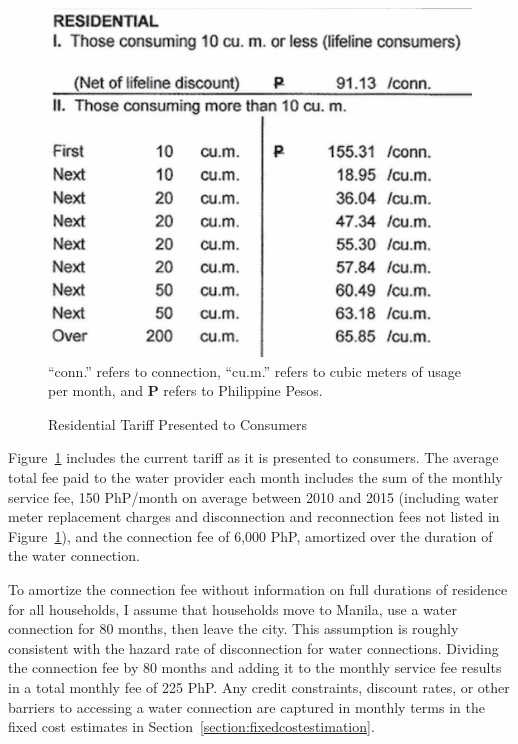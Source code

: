 \documentclass[12pt]{article}
\begin{document}
\begin{appendices}
\begin{figure}
\caption{Residential Tariff Presented to Consumers}\label{figure:tarifftrue}
\begin{center}
\includegraphics[scale=.8]{tables/tariff_pic_png.png} \\
\footnotesize{``conn.'' refers to connection, ``cu.m.'' refers to cubic meters of usage \\ per month, and \textbf{P} refers to Philippine Pesos.}
\end{center}
\end{figure}

Figure~\ref{figure:tarifftrue} includes the current tariff as it is presented to consumers.  The average total fee paid to the water provider each month includes the sum of the monthly service fee, 150 PhP/month on average between 2010 and 2015 (including water meter replacement charges and disconnection and reconnection fees not listed in Figure~\ref{figure:tarifftrue}), and the connection fee of 6,000 PhP, amortized over the duration of the water connection.  

To amortize the connection fee without information on full durations of residence for all households, I assume that households move to Manila, use a water connection for 80 months, then leave the city.  This assumption is roughly consistent with the hazard rate of disconnection for water connections.  Dividing the connection fee by 80 months and adding it to the monthly service fee results in a total monthly fee of 225 PhP.  Any credit constraints, discount rates, or other barriers to accessing a water connection are captured in monthly terms in the fixed cost estimates in Section~\ref{section:fixedcostestimation}.





\end{appendices}
\end{document}
